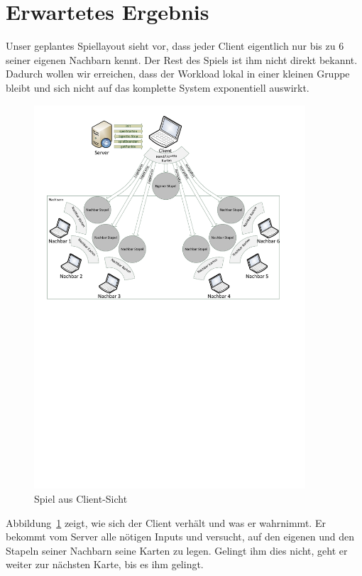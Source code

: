 \section{Erwartetes Ergebnis} 

Unser geplantes Spiellayout sieht vor, dass jeder Client eigentlich nur bis zu 6 seiner eigenen Nachbarn kennt. Der Rest des Spiels ist ihm nicht direkt bekannt. Dadurch wollen wir erreichen, dass der Workload lokal in einer kleinen Gruppe bleibt und sich nicht auf das komplette System exponentiell auswirkt.

\begin{figure}[hbt]
  \centering
  \includegraphics[width=0.9\textwidth,angle=0]{graphics/SpielLayout.pdf}
  \caption{Spiel aus Client-Sicht \hfill{} }
  \label{ergebnisspiellayout}
\end{figure}

Abbildung~\ref{ergebnisspiellayout} zeigt, wie sich der Client verhält und was er wahrnimmt. Er bekommt vom Server alle nötigen Inputs und versucht, auf den eigenen und den Stapeln seiner Nachbarn seine Karten zu legen. Gelingt ihm dies nicht, geht er weiter zur nächsten Karte, bis es ihm gelingt. 

